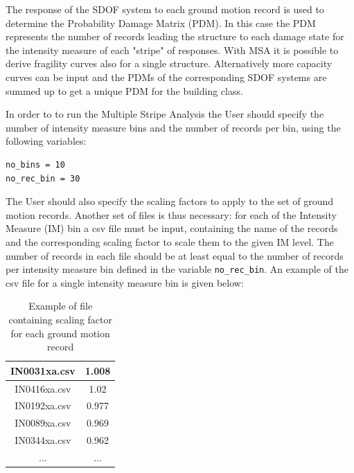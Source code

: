 {The response of the SDOF system to each ground motion record is used to determine the Probability Damage Matrix (PDM). In this case the PDM represents the number of records leading the structure to each damage state for the intensity measure of each "stripe" of responses. With MSA it is possible to derive fragility curves also for a single structure. Alternatively more capacity curves can be input and the PDMs of the corresponding SDOF systems are summed up to get a unique PDM for the building class.

In order to to run the Multiple Stripe Analysis the User should specify the number of intensity measure bins and the number of records per bin, using the following variables:

\begin{Verbatim}[frame=single, commandchars=\\\{\}, samepage=true]
no_bins = 10
no_rec_bin = 30
\end{Verbatim}

The User should also specify the scaling factors to apply to the set of ground motion records. Another set of files is thus necessary: for each of the Intensity Measure (IM) bin a csv file must be input, containing the name of the records and the corresponding scaling factor to scale them to the given IM level. The number of records in each file should be at least equal to the number of records per intensity measure bin defined in the variable \verb=no_rec_bin=. An example of the csv file for a single intensity measure bin is given below:

\begin {table}[htb]
\caption{Example of file containing scaling factor for each ground motion record}
\label{table:scaling}
\begin{center}
  \begin{tabular}{ | c | c |}
  \hline
	IN0031xa.csv & 1.008\\ \hline
	IN0416xa.csv & 1.02\\ \hline
	IN0192xa.csv & 0.977\\ \hline
	IN0089xa.csv & 0.969\\ \hline
	IN0344xa.csv & 0.962\\ \hline
	... & ... \\ \hline
	\end{tabular}
\end{center}
\end{table}

}
